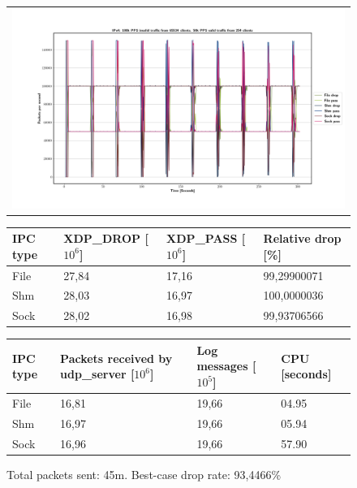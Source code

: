 \begin{figure}[!h]
	\centering
	\scriptsize
	\begin{tabular}{c}
    	\centerline{\includegraphics[width=1.2\textwidth]{images/IPv4_100k_65534_1.png}}
	\end{tabular}
	\begin{tabular}{llll}
		\toprule
		\textbf{IPC type} & \textbf{XDP\_DROP [$10^6$]} & \textbf{XDP\_PASS [$10^6$]} & \textbf{Relative drop [\%]} \\ \midrule 
		File & 27,84 & 17,16 & 99,29900071 \\
        Shm & 28,03 & 16,97 & 100,0000036 \\
        Sock & 28,02 & 16,98 & 99,93706566 \\
	\bottomrule
	\end{tabular}
    \begin{tabular}{llll}
		\toprule
		\textbf{IPC type} & \textbf{Packets received by udp\_server [$10^6$]} & \textbf{Log messages [$10^5$]} & \textbf{CPU [seconds]} \\ \midrule 
		File & 16,81 & 19,66 & 04.95 \\
        Shm & 16,97 & 19,66 & 05.94 \\
        Sock & 16,96 & 19,66 & 57.90 \\
	\bottomrule
	\end{tabular}
	\caption[Simplefail2ban, IPv4, 100k \ac{PPS}, 65534 malicious clients]{Total packets sent: 45m. Best-case drop rate: 93,4466\%}
	\label{fig:data:ipv4:100k:65534}
\end{figure}

